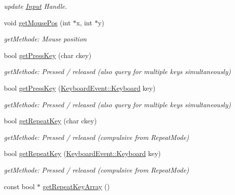 \begin{DoxyCompactItemize}
\begin{DoxyCompactList}\small\item\em update \hyperlink{class_f2_c_1_1_input}{Input} Handle. \item\end{DoxyCompactList}\item 
void \hyperlink{class_f2_c_1_1_input_afe44e50d55a10eac43f4d114d01fcc9e}{getMousePos} (int $\ast$x, int $\ast$y)
\begin{DoxyCompactList}\small\item\em getMethode: Mouse position \item\end{DoxyCompactList}\item 
bool \hyperlink{class_f2_c_1_1_input_af3d14b1d81e6198c5e0fb5fccbdd0b5c}{getPressKey} (char ckey)
\begin{DoxyCompactList}\small\item\em getMethode: Pressed / released (also query for multiple keys simultaneously) \item\end{DoxyCompactList}\item 
bool \hyperlink{class_f2_c_1_1_input_a5684e139903d71e9a7a0ac6d209895a1}{getPressKey} (\hyperlink{namespace_f2_c_1_1_keyboard_event_a13172bec547dc5eb2eee6c4fcd64c486}{KeyboardEvent::Keyboard} key)
\begin{DoxyCompactList}\small\item\em getMethode: Pressed / released (also query for multiple keys simultaneously) \item\end{DoxyCompactList}\item 
bool \hyperlink{class_f2_c_1_1_input_a5fab8a63b42332d5da2c648654a93f82}{getRepeatKey} (char ckey)
\begin{DoxyCompactList}\small\item\em getMethode: Pressed / released (compulsive from RepeatMode) \item\end{DoxyCompactList}\item 
bool \hyperlink{class_f2_c_1_1_input_aba74013667f7cc0ea8d3b53de03262cd}{getRepeatKey} (\hyperlink{namespace_f2_c_1_1_keyboard_event_a13172bec547dc5eb2eee6c4fcd64c486}{KeyboardEvent::Keyboard} key)
\begin{DoxyCompactList}\small\item\em getMethode: Pressed / released (compulsive from RepeatMode) \item\end{DoxyCompactList}\item 
\hypertarget{class_f2_c_1_1_input_a033f3bf6ea0c0883b76af3fb9b7f0c05}{
const bool $\ast$ \hyperlink{class_f2_c_1_1_input_a033f3bf6ea0c0883b76af3fb9b7f0c05}{getRepeatKeyArray} ()}
\label{class_f2_c_1_1_input_a033f3bf6ea0c0883b76af3fb9b7f0c05}


\end{DoxyCompactItemize}
